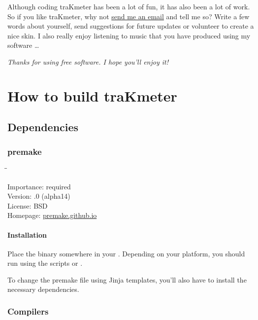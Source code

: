 Although coding traKmeter has been a lot of fun, it has also been a
lot of work.  So if you like traKmeter, why not
\href{http://www.mzuther.de/}{send me an email} and tell me so?  Write
a few words about yourself, send suggestions for future updates or
volunteer to create a nice skin.  I also really enjoy listening to
music that you have produced using my software \dots

\emph{Thanks for using free software.  I hope you'll enjoy it!}

\appendix

\chapter{How to build traKmeter}
\label{chap:build_trakmeter}

\section{Dependencies}
\label{sec:dependencies}

\subsection{premake}
\label{sec:dependencies_premake}

\begin{tabbing}
  \hspace*{6em}\=\=\kill

  Importance:  \> required \\
  Version:     .0 (alpha14) \\
  License:     \> BSD \\
  Homepage:    \> \href{https://premake.github.io/}{premake.github.io}
\end{tabbing}

\subsubsection{Installation}

Place the binary somewhere in your .  Depending on your
platform, you should run  using the scripts
 or .

To change the premake file using Jinja templates, you'll also have to
install the necessary dependencies.

\subsection{Compilers}

